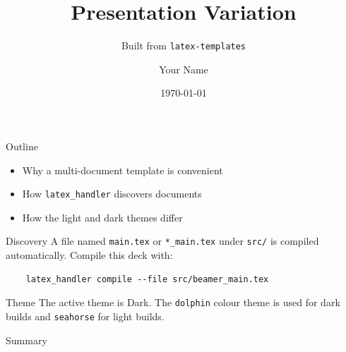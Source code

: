 \documentclass{beamer}
\title{Presentation Variation}
\subtitle{Built from \texttt{latex-templates}}
\author{Your Name}
\date{\today}
\def\lhthemevalue{Light}
\def\lhthemevalue{Dark}
\providecommand{\lhbar}{}
\providecommand{\lhfootertext}{}
\begin{document}
\frame{\titlepage}

\begin{frame}{Outline}
  \begin{itemize}
    \item Why a multi-document template is convenient
    \item How \texttt{latex\_handler} discovers documents
    \item How the light and dark themes differ
  \end{itemize}
\end{frame}

\begin{frame}[fragile]{Discovery}
  A file named \texttt{main.tex} or \texttt{*\_main.tex} under \texttt{src/} is
  compiled automatically. Compile this deck with:
  \begin{verbatim}
    latex_handler compile --file src/beamer_main.tex
  \end{verbatim}
\end{frame}

\begin{frame}{Theme}
  The active theme is \alert{\lhthemevalue}. The \texttt{dolphin} colour theme is
  used for dark builds and \texttt{seahorse} for light builds.
  \lhbar
\end{frame}

\begin{frame}{Summary}
  \lhfootertext
\end{frame}
\end{document}

